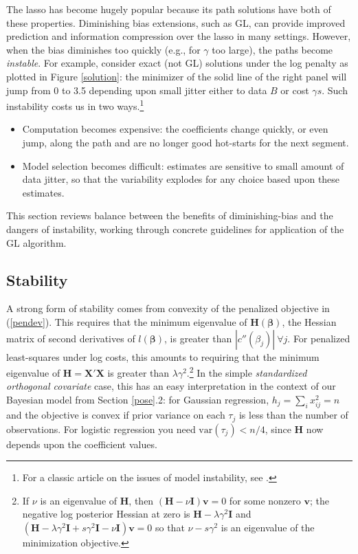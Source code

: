 \documentclass[12pt]{article}
\newcommand{\bs}[1]{\boldsymbol{#1}}
\newcommand{\mr}[1]{\mathrm{#1}}
\newcommand{\bm}[1]{\mathbf{#1}}
\begin{document}
The lasso has become hugely popular because its path solutions have both of
these properties.  Diminishing bias extensions, such as GL, can provide
improved prediction and information compression over the lasso in many
settings.  However, when the bias diminishes too quickly (e.g., for $\gamma$
too large), the paths become {\it instable}. For example, consider exact (not
GL) solutions under the log penalty as plotted in Figure \ref{solution}: the
minimizer of the solid line of the right panel  will jump from 0 to 3.5
depending upon small jitter either to data $B$ or cost $\gamma s$.  Such
instability costs us in two ways.\footnote{For a classic article on the issues
of model instability, see \citet{breiman_heuristics_1996}.}
\begin{itemize}
\item Computation becomes expensive:
the coefficients change quickly, or even jump, along the path and are no
longer good hot-starts for the next segment.
\item Model selection becomes difficult:  estimates are sensitive to 
small amount of data jitter, so that the variability explodes for any choice
based upon these estimates.
\end{itemize}
This section reviews balance between the benefits of diminishing-bias and
the dangers of instability, working through concrete guidelines for
application of the GL algorithm.

\subsection{Stability}

A strong form of stability comes from convexity of the penalized objective in
(\ref{pendev}). This requires that the minimum eigenvalue of
$\bm{H}(\bs{\beta})$, the Hessian matrix of second derivatives of
$l(\bs{\beta})$, is greater than $|c''(\beta_j)| ~\forall j$.  For penalized
least-squares under log costs, this amounts to requiring that the minimum
eigenvalue of $\bm{H} = \bm{X}'\bm{X}$ is greater than
$\lambda\gamma^2$.\footnote{ If $\nu$ is an eigenvalue of $\bm{H}$, then
$(\bm{H} -
\nu \bm{I})\bm{v} = 0$ for some nonzero $\bm{v}$; the negative log posterior
Hessian at zero is $\bm{H} - \lambda\gamma^2\bm{I}$ and $(\bm{H} -
\lambda\gamma^2\bm{I} + s\gamma^2\bm{I} -
\nu \bm{I})\bm{v} = 0$ so that 
$\nu - s\gamma^2$ is an eigenvalue of the minimization objective.  }  In the
simple {\it standardized orthogonal covariate} case, this has an easy
interpretation in the context of our Bayesian model from Section \ref{pose}.2:
for Gaussian regression, $h_j = \sum_i x_{ij}^2 = n$ and the objective is
convex if prior variance on each $\tau_j$  is less than the number of
observations.  For logistic regression you need $\mr{var}(\tau_j) < n/4$,
since $\bm{H}$ now depends upon the coefficient values.
\end{document}
